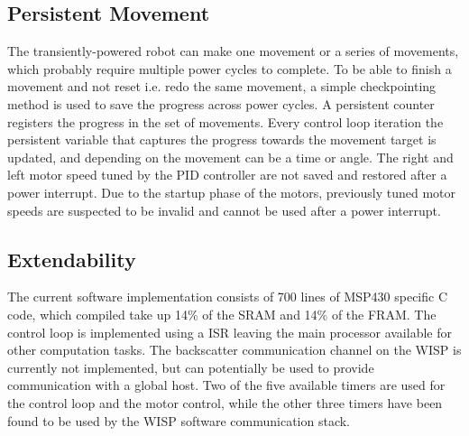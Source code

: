 \subsection{Persistent Movement}
The transiently-powered robot can make one movement or a series of movements, which probably require multiple power cycles to complete.
To be able to finish a movement and not reset i.e. redo the same movement, a simple checkpointing method is used to save the progress across power cycles.
A persistent counter registers the progress in the set of movements.
Every control loop iteration the persistent variable that captures the progress towards the movement target is updated, and depending on the movement can be a time or angle.
The right and left motor speed tuned by the PID controller are not saved and restored after a power interrupt.
Due to the startup phase of the motors, previously tuned motor speeds are suspected to be invalid and cannot be used after a power interrupt. 

\subsection{Extendability}
The current software implementation consists of 700 lines of MSP430 specific C code, which compiled take up 14\% of the SRAM and 14\% of the FRAM.
The control loop is implemented using a ISR leaving the main processor available for other computation tasks.
The backscatter communication channel on the WISP is currently not implemented, but can potentially be used to provide communication with a global host. 
Two of the five available timers are used for the control loop and the motor control, while the other three timers have been found to be used by the WISP software communication stack.
 

